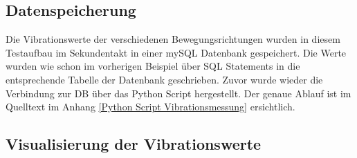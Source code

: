 

\subsection{Datenspeicherung}
\label{subsection_Speicherung_der_Vibrationsdaten}
Die Vibrationswerte der verschiedenen Bewegungsrichtungen wurden in diesem Testaufbau im Sekundentakt in einer mySQL Datenbank gespeichert. Die Werte wurden wie schon im vorherigen Beispiel über SQL Statements in die entsprechende Tabelle der Datenbank geschrieben. Zuvor wurde wieder die Verbindung zur DB über das Python Script hergestellt. Der genaue Ablauf ist im Quelltext im Anhang \ref{Python Script Vibrationsmessung} ersichtlich.

\subsection{Visualisierung der Vibrationswerte}
\label{subsection_Visualisierung der Vibrationswerte}